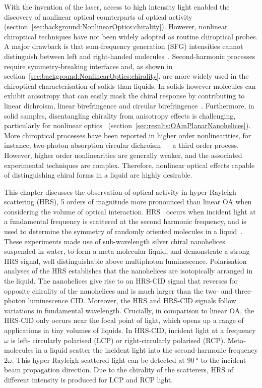 With the invention of the laser, access to high intensity light enabled the discovery of nonlinear optical counterparts of optical activity (section~\ref{sec:background:NonlinearOptics:chirality}). However, nonlinear chiroptical techniques have not been widely adopted as routine chiroptical probes. A major drawback is that sum-frequency generation (SFG) intensities cannot distinguish between left and right-handed molecules~\cite{Valev2013b}. 
Second-harmonic processes require symmetry-breaking interfaces and, as shown in section~\ref{sec:background:NonlinearOptics:chirality}, are more widely used in the chiroptical characterisation of solids than liquids. In solids however molecules can exhibit anisotropy that can easily mask the chiral response by contributing to linear dichroism, linear birefringence and circular birefringence~\cite{Kuroda2001}.
Furthermore, in solid samples, disentangling chirality from anisotropy effects is challenging, particularly for nonlinear optics~\cite{Hooper2017} (section~\ref{sec:results:OAinPlanarNanohelices}). More chiroptical processes have been reported in higher order nonlinearities, for instance, two-photon absorption circular dichroism~\cite{Tinoco1975, DeBoni2008, Toro2010} – a third order process. However, higher order nonlinearities are generally weaker, and the associated experimental techniques are complex. Therefore, nonlinear optical effects capable of distinguishing chiral forms in a liquid are highly desirable. 

This chapter discusses the observation of optical activity in hyper-Rayleigh scattering (HRS), 5 orders of magnitude more pronounced than linear OA when considering the volume of optical interaction. HRS~\cite{Clays1991b, Clays1992} occurs when incident light at a fundamental frequency is scattered at the second harmonic frequency, and is used to determine the symmetry of randomly oriented molecules in a liquid~\cite{Verbiest1994a}.
These experiments made use of sub-wavelength silver chiral nanohelices suspended in water, to form a meta-molecular liquid, and demonstrate a strong HRS signal, well distinguishable above multiphoton luminescence. Polarisation analyses of the HRS establishes that the nanohelices are isotopically arranged in the liquid. The nanohelices give rise to an HRS-CID signal that reverses for opposite chirality of the nanohelices and is much larger than the two- and three-photon luminescence CID. Moreover, the HRS and HRS-CID signals follow variations in fundamental wavelength. Crucially, in comparison to linear OA, the HRS-CID only occurs near the focal point of light, which opens up a range of applications in tiny volumes of liquids. 
In HRS-CID, incident light at a frequency $\omega$ is left- circularly polarised (LCP) or right-circularly polarised (RCP). Meta-molecules in a liquid scatter the incident light into the second-harmonic frequency $2\omega$. This hyper-Rayleigh scattered light can be detected at $\SI{90}{\degree}$ to the incident beam propagation direction. Due to the chirality of the scatterers, HRS of different intensity is produced for LCP and RCP light.


